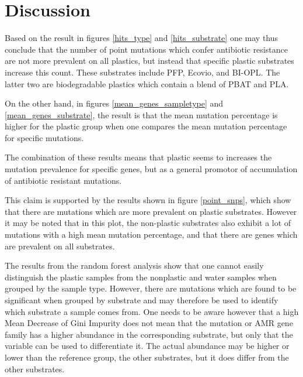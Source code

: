 \chapter{Discussion}



Based on the result in figures \ref{hits_type} and \ref{hits_substrate} one may thus conclude that the number of point mutations which confer antibiotic resistance are not more prevalent on all plastics, but instead that specific plastic substrates increase this count.
These substrates include PFP, Ecovio, and BI-OPL. The latter two are biodegradable plastics which contain a blend of PBAT and PLA. 

On the other hand, in figures \ref{mean_genes_sampletype} and \ref{mean_genes_substrate}, the result is that the mean mutation percentage is higher for the plastic group when one compares the mean mutation percentage for specific mutations. 

The combination of these 
results means that plastic seems to increases the mutation prevalence for specific genes, but as a general promotor of accumulation of antibiotic resistant mutations.

This claim is supported by the results shown in figure \ref{point_snps}, which show that there are mutations which are more prevalent on plastic substrates. However it may be noted that in this plot, the non-plastic substrates also exhibit a lot of mutations with a high mean mutation percentage, and that there are genes which are prevalent on all substrates.

The results from the random forest analysis show that one cannot easily distinguish the plastic samples from the nonplastic and water samples when grouped by the sample type.
However, there are mutations which are found to be significant when grouped by substrate and may therefore be used to identify which substrate a sample comes from.
One needs to be aware however that a high Mean Decrease of Gini Impurity does not mean that the mutation or AMR gene family has a higher abundance in the corresponding substrate, but only that the variable can be used to differentiate it. The actual abundance may be higher or lower than the reference group, the other substrates, but it does differ from the other substrates. 

